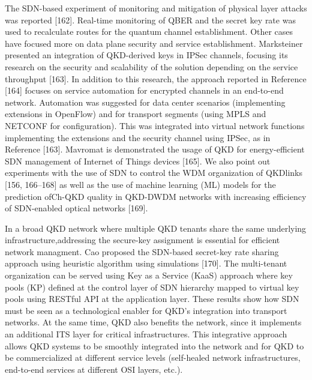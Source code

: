 The SDN-based experiment of monitoring and mitigation of physical layer attacks was reported [162]. Real-time monitoring of QBER and the secret key rate was used to recalculate routes for the quantum channel establishment.
Other cases have focused more on data plane security and service establishment. Marksteiner presented an integration of QKD-derived keys in IPSec channels, focusing its research on the security and scalability of the solution depending on the service throughput [163]. In addition to this research, the approach reported in Reference [164] focuses on service automation for encrypted channels in an end-to-end network. Automation was suggested for data center scenarios (implementing extensions in OpenFlow) and for transport segments (using MPLS and NETCONF for configuration). This was integrated into virtual network functions implementing the extensions and the security channel using IPSec, as in Reference [163]. Mavromat is demonstrated the usage of QKD for energy-efficient SDN management of Internet of Things devices [165].
We also point out experiments with the use of SDN to control the WDM organization of QKDlinks [156, 166–168] as well as the use of machine learning (ML) models for the prediction ofCh-QKD quality in QKD-DWDM networks with increasing efficiency of SDN-enabled optical networks [169].

In a broad QKD network where multiple QKD tenants share the same underlying infrastructure,addressing the secure-key assignment is essential for efficient network managment. Cao proposed the SDN-based secret-key rate sharing approach using heuristic algorithm using simulations [170].
The multi-tenant organization can be served using Key as a Service (KaaS) approach where key pools (KP) defined at the control layer of SDN hierarchy mapped to virtual key pools using RESTful API at the application layer.
These results show how SDN must be seen as a technological enabler for QKD’s integration into transport networks. At the same time, QKD also benefits the network, since it implements an additional ITS layer for critical infrastructures. This integrative approach allows QKD systems to be smoothly integrated into the network and for QKD to be commercialized at different service levels (self-healed network infrastructures, end-to-end services at different OSI layers, etc.).

